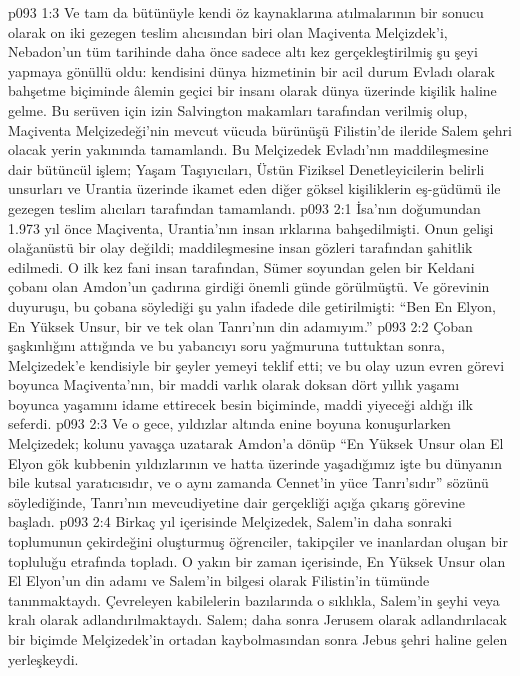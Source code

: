 \vs p093 1:3 Ve tam da bütünüyle kendi öz kaynaklarına atılmalarının bir sonucu olarak on iki gezegen teslim alıcısından biri olan Maçiventa Melçizdek’i, Nebadon’un tüm tarihinde daha önce sadece altı kez gerçekleştirilmiş şu şeyi yapmaya gönüllü oldu: kendisini dünya hizmetinin bir acil durum Evladı olarak bahşetme biçiminde âlemin geçici bir insanı olarak dünya üzerinde kişilik haline gelme. Bu serüven için izin Salvington makamları tarafından verilmiş olup, Maçiventa Melçizedeği’nin mevcut vücuda bürünüşü Filistin’de ileride Salem şehri olacak yerin yakınında tamamlandı. Bu Melçizedek Evladı’nın maddileşmesine dair bütüncül işlem; Yaşam Taşıyıcıları, Üstün Fiziksel Denetleyicilerin belirli unsurları ve Urantia üzerinde ikamet eden diğer göksel kişiliklerin eş\hyp{}güdümü ile gezegen teslim alıcıları tarafından tamamlandı.
\vs p093 2:1 İsa’nın doğumundan 1.973 yıl önce Maçiventa, Urantia’nın insan ırklarına bahşedilmişti. Onun gelişi olağanüstü bir olay değildi; maddileşmesine insan gözleri tarafından şahitlik edilmedi. O ilk kez fani insan tarafından, Sümer soyundan gelen bir Keldani çobanı olan Amdon’un çadırına girdiği önemli günde görülmüştü. Ve görevinin duyuruşu, bu çobana söylediği şu yalın ifadede dile getirilmişti: “Ben En Elyon, En Yüksek Unsur, bir ve tek olan Tanrı’nın din adamıyım.”
\vs p093 2:2 Çoban şaşkınlığını attığında ve bu yabancıyı soru yağmuruna tuttuktan sonra, Melçizedek’e kendisiyle bir şeyler yemeyi teklif etti; ve bu olay uzun evren görevi boyunca Maçiventa’nın, bir maddi varlık olarak doksan dört yıllık yaşamı boyunca yaşamını idame ettirecek besin biçiminde, maddi yiyeceği aldığı ilk seferdi.
\vs p093 2:3 Ve o gece, yıldızlar altında enine boyuna konuşurlarken Melçizedek; kolunu yavaşça uzatarak Amdon’a dönüp “En Yüksek Unsur olan El Elyon gök kubbenin yıldızlarının ve hatta üzerinde yaşadığımız işte bu dünyanın bile kutsal yaratıcısıdır, ve o aynı zamanda Cennet’in yüce Tanrı’sıdır” sözünü söylediğinde, Tanrı’nın mevcudiyetine dair gerçekliği açığa çıkarış görevine başladı.
\vs p093 2:4 Birkaç yıl içerisinde Melçizedek, Salem’in daha sonraki toplumunun çekirdeğini oluşturmuş öğrenciler, takipçiler ve inanlardan oluşan bir topluluğu etrafında topladı. O yakın bir zaman içerisinde, En Yüksek Unsur olan El Elyon’un din adamı ve Salem’in bilgesi olarak Filistin’in tümünde tanınmaktaydı. Çevreleyen kabilelerin bazılarında o sıklıkla, Salem’in şeyhi veya kralı olarak adlandırılmaktaydı. Salem; daha sonra Jerusem olarak adlandırılacak bir biçimde Melçizedek’in ortadan kaybolmasından sonra Jebus şehri haline gelen yerleşkeydi.
